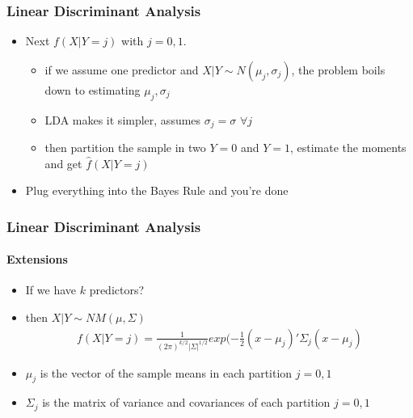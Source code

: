 \documentclass[
  shownotes,
  xcolor={svgnames},
  hyperref={colorlinks,citecolor=DarkBlue,linkcolor=andesred,urlcolor=DarkBlue}
  , aspectratio=169]{beamer}
\begin{document}
\begin{frame}[fragile]
\frametitle{Linear Discriminant Analysis}


\begin{itemize}
    \item Next $f(X|Y=j)$ with $j=0,1$. 
    \medskip
    \begin{itemize}
    \item if we assume one predictor and $X|Y\sim N(\mu_j,\sigma_j)$, the problem boils down to estimating $\mu_j,\sigma_j$
    \medskip
    \item LDA makes it simpler, assumes $\sigma_j=\sigma$ $\forall j$
    \medskip
    \item then partition the sample in two $Y=0$ and $Y=1$, estimate the moments and get $\hat{f}(X|Y=j)$
    \medskip
    \end{itemize}
    \item Plug everything into the Bayes Rule and you're done
    
\end{itemize}


\end{frame}
\begin{frame}[fragile]
\frametitle{Linear Discriminant Analysis}
\framesubtitle{Extensions}

\begin{itemize}
    \item If we have $k$ predictors?
    \medskip
    \item then $X|Y \sim NM(\mu,\Sigma)$
    \begin{align}
    f(X|Y=j) = \frac{1}{(2\pi)^{k/2}|\Sigma|^{1/2}}exp(-\frac{1}{2}(x-\mu_j)'\Sigma_j(x-\mu_j)
    \end{align}
    \item $\mu_j$ is the vector of the sample means in each partition $j=0,1$
    \medskip
    \item $\Sigma_j$ is the matrix of variance and covariances of each partition $j=0,1$
    
    \end{itemize}
\end{frame}
\end{document}
